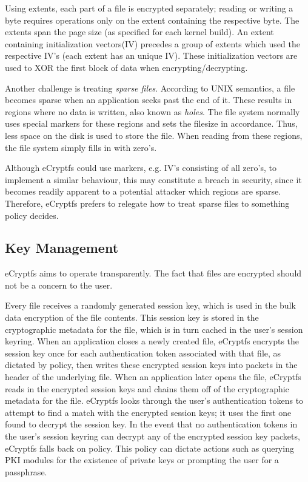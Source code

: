 Using extents, each part of a file is encrypted separately; reading or writing a byte requires operations only on the extent containing the respective byte. The extents span the page size (as specified for each kernel build). An extent containing initialization vectors(IV) precedes a group of extents which used the respective IV's (each extent has an unique IV). These initialization vectors are used to XOR the first block of data when encrypting/decrypting.

Another challenge is treating \textit{sparse files}. According to UNIX semantics, a file becomes sparse when an application seeks past the end of it. These results in regions where no data is written, also known as \textit{holes}. The file system normally uses special markers for these regions and sets the filesize in accordance. Thus, less space on the disk is used to store the file. When reading from these regions, the file system simply fills in with zero's.

Although eCryptfs could use markers, e.g. IV's consisting of all zero's, to implement a similar behaviour, this may constitute a breach in security, since it becomes readily apparent to a potential attacker which regions are sparse.
Therefore, eCryptfs prefers to relegate how to treat sparse files to something policy decides.

\subsection{Key Management}
\label{sub-sec:keys-ecryptfs}

eCryptfs aims to operate transparently. The fact that files are encrypted should not be a concern to the user.

Every file receives a randomly generated session key, which is used in the bulk data encryption of the file contents. This session key is stored in the cryptographic metadata for the file, which is in turn cached in the user’s session keyring. When an application closes a newly created file, eCryptfs encrypts the session key once for each authentication token associated with that file, as dictated by policy, then writes these encrypted session keys into packets in the header of the underlying file.
When an application later opens the file, eCryptfs reads in the encrypted session keys and chains them off of the cryptographic metadata for the file. eCryptfs looks through the user’s authentication tokens to attempt to find a match with the encrypted session keys; it uses the first one found to decrypt the session key. In the event that no authentication tokens in the user’s session keyring can decrypt any of the encrypted session key packets, eCryptfs falls back on policy. This policy can dictate actions such as querying PKI modules for the existence of private keys or prompting the user for a passphrase.

